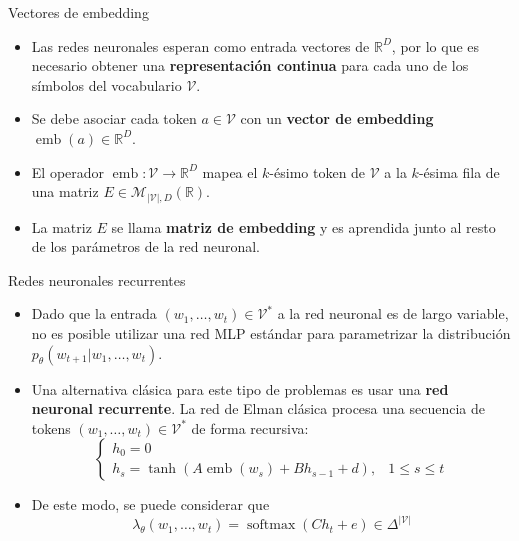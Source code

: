 \documentclass{beamer}
\newcommand{\R}{\mathbb{R}}
\begin{document}
\begin{frame}{Vectores de embedding}
    \begin{itemize}
        \item Las redes neuronales esperan como entrada vectores de $\R^D$, por lo que es necesario obtener una \textbf{representación continua} para cada uno de los símbolos del vocabulario $\mathcal{V}$.
        \item Se debe asociar cada token $a\in\mathcal{V}$ con un \textbf{vector de embedding} $\operatorname{emb}(a)\in\R^D$.
        \item El operador $\operatorname{emb}:\mathcal{V}\to\R^D$ mapea el $k$-ésimo token de $\mathcal{V}$ a la $k$-ésima fila de una matriz $E\in\mathcal{M}_{|\mathcal{V}|,D}(\R)$.
        \item La matriz $E$ se llama \textbf{matriz de embedding} y es aprendida junto al resto de los parámetros de la red neuronal.
    \end{itemize}
\end{frame}

\begin{frame}{Redes neuronales recurrentes}
    \begin{itemize}
        \item Dado que la entrada $(w_1,\ldots,w_t)\in\mathcal{V}^*$ a la red neuronal es de largo variable, no es posible utilizar una red MLP estándar para parametrizar la distribución $p_\theta(w_{t+1}|w_1,\ldots,w_t)$.
        \item Una alternativa clásica para este tipo de problemas es usar una \textbf{red neuronal recurrente}. La red de Elman clásica procesa una secuencia de tokens $(w_1,\ldots,w_t)\in\mathcal{V}^*$ de forma recursiva:
              \begin{equation*}
                  \begin{cases}
                      h_0 = 0                                            \\
                      h_s =\tanh(A\operatorname{emb}(w_s)+Bh_{s-1}+d), &
                      1\leq s\leq t
                  \end{cases}
              \end{equation*}
        \item  De este modo, se puede considerar que
              \begin{equation*}
                  \lambda_\theta(w_1,\ldots,w_t)=\operatorname{softmax}(Ch_t+e)\in\Delta^{|\mathcal{V}|}
              \end{equation*}
    \end{itemize}
\end{frame}
\end{document}
